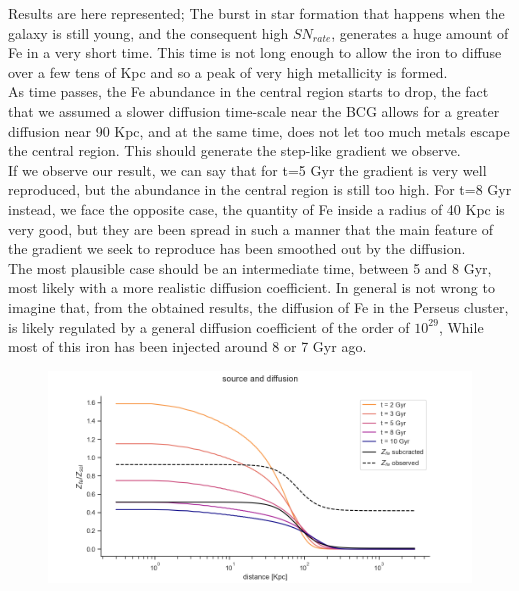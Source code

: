 \documentclass{article}
\begin{document}
Results are here represented; The burst in star formation that happens when the galaxy is still young, and the consequent high $SN_{rate}$, generates a huge amount of Fe in a very short time. This time is not long enough to allow the iron to diffuse over a few tens of Kpc and so a peak of very high metallicity is formed.\\ As time passes, the Fe abundance in the central region starts to drop, the fact that we assumed a slower diffusion time-scale near the BCG allows for a greater diffusion near 90 Kpc, and at the same time, does not let too much metals escape the central region. This should generate the step-like gradient we observe. \\ If we observe our result, we can say that for t=5 Gyr the gradient is very well reproduced, but the abundance in the central region is still too high. For t=8 Gyr instead, we face the opposite case, the quantity of Fe inside a radius of 40 Kpc is very good, but they are been spread in such a manner that the main feature of the gradient we seek to reproduce has been smoothed out by the diffusion. \\  The most plausible case should be an intermediate time, between 5 and 8 Gyr, most likely with a more realistic diffusion coefficient. In general is not wrong to imagine that, from the obtained results, the diffusion of Fe in the Perseus cluster, is likely regulated by a general diffusion coefficient of the order of $10^{29}$, While most of this iron has been injected around 8 or 7 Gyr ago. 

\begin{figure}[ht]
 \begin{minipage}[b]{8cm}
   
   \includegraphics[trim = 0 0 0 0,width=16cm]{kappa.png}
 \end{minipage}
 \ \hspace{2mm} \hspace{1mm} \
\end{figure}
\end{document}
